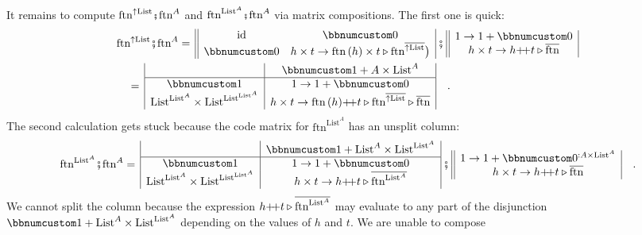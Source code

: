 It remains to compute $\text{ftn}^{\uparrow\text{List}}\bef\text{ftn}^{A}$
and $\text{ftn}^{\text{List}^{A}}\bef\text{ftn}^{A}$ via matrix compositions.
The first one is quick:
\begin{align*}
 & \text{ftn}^{\uparrow\text{List}}\bef\text{ftn}^{A}=\,\begin{array}{||cc|}
\text{id} & \bbnum 0\\
\bbnum 0 & h\times t\rightarrow\text{ftn}\,(h)\times t\triangleright\text{ftn}^{\overline{\uparrow\text{List}}}\big)
\end{array}\,\bef\,\begin{array}{||c|}
1\rightarrow1+\bbnum 0\\
h\times t\rightarrow h\pplus t\triangleright\overline{\text{ftn}}
\end{array}\\
 & \quad=\,\begin{array}{|c|c|}
 & \bbnum 1+A\times\text{List}^{A}\\
\hline \bbnum 1 & 1\rightarrow1+\bbnum 0\\
\text{List}^{\text{List}^{A}}\times\text{List}^{\text{List}^{\text{List}^{A}}} & h\times t\rightarrow\text{ftn}\,(h)\pplus t\triangleright\text{ftn}^{\overline{\uparrow\text{List}}}\triangleright\overline{\text{ftn}}
\end{array}\quad.
\end{align*}
The second calculation gets stuck because the code matrix for $\text{ftn}^{\text{List}^{A}}$
has an unsplit column:
\[
\text{ftn}^{\text{List}^{A}}\bef\text{ftn}^{A}=\,\begin{array}{|c|c|}
 & \bbnum 1+\text{List}^{A}\times\text{List}^{\text{List}^{A}}\\
\hline \bbnum 1 & 1\rightarrow1+\bbnum 0\\
\text{List}^{\text{List}^{A}}\times\text{List}^{\text{List}^{\text{List}^{A}}} & h\times t\rightarrow h\pplus t\triangleright\overline{\text{ftn}^{\text{List}^{A}}}
\end{array}\,\bef\,\begin{array}{||c|}
1\rightarrow1+\bbnum 0^{:A\times\text{List}^{A}}\\
h\times t\rightarrow h\pplus t\triangleright\overline{\text{ftn}}
\end{array}\quad.
\]
We cannot split the column because the expression $h{\displaystyle }{+\negmedspace+} t\triangleright\overline{\text{ftn}^{\text{List}^{A}}}$
may evaluate to any part of the disjunction $\bbnum 1+\text{List}^{A}\times\text{List}^{\text{List}^{A}}$
depending on the values of $h$ and $t$. We are unable to compose
